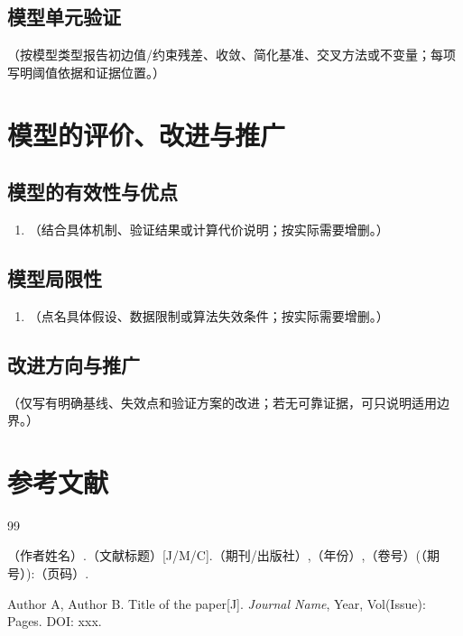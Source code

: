 \documentclass[12pt, a4paper]{article}
\begin{document}
\subsection{模型单元验证}

（按模型类型报告初边值/约束残差、收敛、简化基准、交叉方法或不变量；每项写明阈值依据和证据位置。）

\section{模型的评价、改进与推广}

\subsection{模型的有效性与优点}

\begin{enumerate}
    \item （结合具体机制、验证结果或计算代价说明；按实际需要增删。）
\end{enumerate}

\subsection{模型局限性}

\begin{enumerate}
    \item （点名具体假设、数据限制或算法失效条件；按实际需要增删。）
\end{enumerate}

\subsection{改进方向与推广}

（仅写有明确基线、失效点和验证方案的改进；若无可靠证据，可只说明适用边界。）

\section*{参考文献}
\begin{thebibliography}{99}

（作者姓名）.（文献标题）[J/M/C].（期刊/出版社）,（年份）,（卷号）(（期号）):（页码）.

Author A, Author B. Title of the paper[J]. \textit{Journal Name}, Year, Vol(Issue): Pages. DOI: xxx.


\end{thebibliography}
\end{document}
